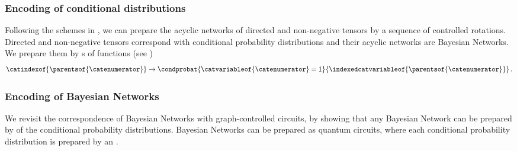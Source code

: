 %
%

\subsubsection{Encoding of conditional distributions}


Following the schemes in \cite{low_quantum_2014}, we can prepare the acyclic networks of directed and non-negative tensors by a sequence of controlled rotations.
Directed and non-negative tensors correspond with conditional probability distributions and their acyclic networks are Bayesian Networks.
We prepare them by \activationCircuit{}s of functions (see )
\begin{align*}
    \catindexof{\parentsof{\catenumerator}} \rightarrow \condprobat{\catvariableof{\catenumerator}=1}{\indexedcatvariableof{\parentsof{\catenumerator}}} \, .
\end{align*}

\subsubsection{Encoding of Bayesian Networks}

We revisit the correspondence of Bayesian Networks with graph-controlled circuits, by showing that any Bayesian Network can be prepared by \activationCircuits{} of the conditional probability distributions.
Bayesian Networks can be prepared as quantum circuits, where each conditional probability distribution is prepared by an \activationCircuit{}.

